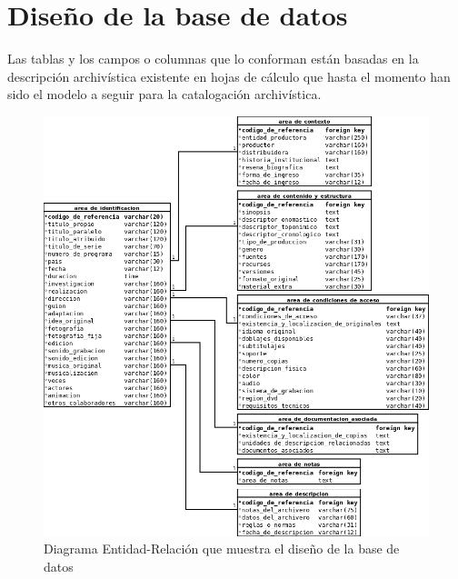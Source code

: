 \documentclass[10pt,letterpaper]{article}
\begin{document}
\section{Diseño de la base de datos}
Las tablas y los campos o columnas que lo conforman están basadas en la descripción archivística existente en hojas de cálculo que hasta el momento han sido el modelo a seguir para la catalogación archivística.

\begin{figure}[H]
	\centering
	\includegraphics[keepaspectratio=true,width=\linewidth]{EntidadRelacion.png}
	\caption{Diagrama Entidad-Relación que muestra el diseño de la base de datos}
	\label{fig:entidad_relacion}
\end{figure}
\end{document}
